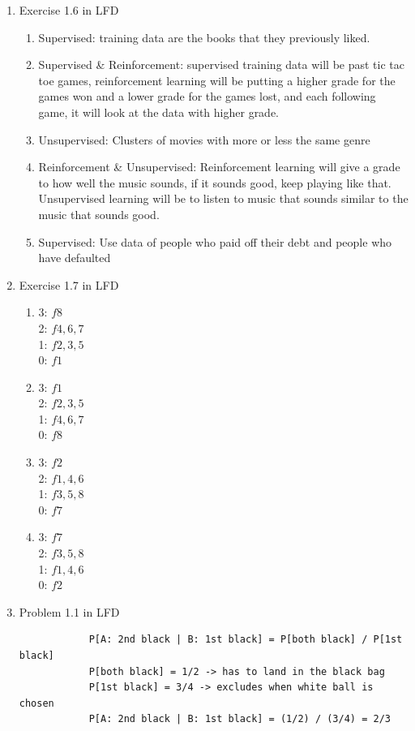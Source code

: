 \documentclass{article}
\begin{document}
\begin{enumerate}
        \item Exercise 1.6 in LFD
        \begin{enumerate}[label=(\alph*)]
            \item Supervised: training data are the books that they previously liked.
            \item Supervised \& Reinforcement: supervised training data will be past tic tac toe games, reinforcement learning will be putting a higher grade for the games won and a lower grade for the games lost, and each following game, it will look at the data with higher grade.
            \item Unsupervised: Clusters of movies with more or less the same genre
            \item Reinforcement \& Unsupervised: Reinforcement learning will give a grade to how well the music sounds, if it sounds good, keep playing like that. Unsupervised learning will be to listen to music that sounds similar to the music that sounds good.
            \item Supervised: Use data of people who paid off their debt and people who have defaulted
        \end{enumerate}

        \item Exercise 1.7 in LFD
        \begin{enumerate}[label=(\alph*)]
            \item 3: $f8$ \\ 2: $f4, 6, 7$ \\ 1: $f2, 3, 5$ \\ 0: $f1$
            \item 3: $f1$ \\ 2: $f2,3,5$ \\ 1: $f4,6,7$ \\ 0: $f8$
            \item 3: $f2$ \\ 2: $f1, 4, 6$ \\ 1: $f3,5,8$ \\ 0: $f7$
            \item 3: $f7$ \\ 2: $f3,5,8$ \\ 1: $f1,4,6$ \\ 0: $f2$
        \end{enumerate}

        \item Problem 1.1 in LFD
        \begin{verbatim}
            P[A: 2nd black | B: 1st black] = P[both black] / P[1st black]
            P[both black] = 1/2 -> has to land in the black bag
            P[1st black] = 3/4 -> excludes when white ball is chosen
            P[A: 2nd black | B: 1st black] = (1/2) / (3/4) = 2/3
        \end{verbatim}


\end{enumerate}
\end{document}
